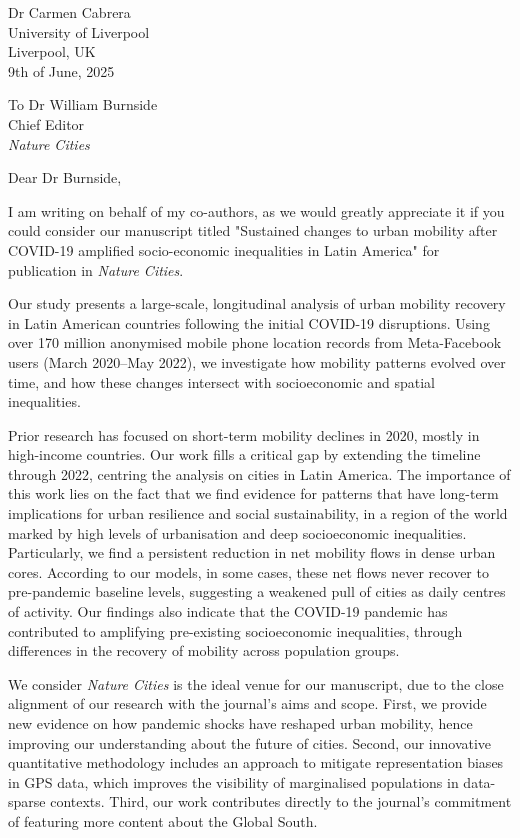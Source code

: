 \documentclass[fleqn,10pt]{letter}
\begin{document}
\begin{flushright}
Dr Carmen Cabrera\\
University of Liverpool\\
Liverpool, UK\\
9th of June, 2025\\
\end{flushright}

\begin{flushleft}
To Dr William Burnside \\
Chief Editor \\
\textit{Nature Cities} \\
\end{flushleft} 

Dear Dr Burnside,

I am writing on behalf of my co-authors, as we would greatly appreciate it if you could consider our manuscript titled "Sustained changes to urban mobility after COVID-19 amplified socio-economic inequalities in Latin America" for publication in \textit{Nature Cities}.

Our study presents a large-scale, longitudinal analysis of urban mobility recovery in Latin American countries following the initial COVID-19 disruptions. Using over 170 million anonymised mobile phone location records from Meta-Facebook users (March 2020–May 2022), we investigate how mobility patterns evolved over time, and how these changes intersect with socioeconomic and spatial inequalities.

Prior research has focused on short-term mobility declines in 2020, mostly in high-income countries. Our work fills a critical gap by extending the timeline through 2022, centring the analysis on cities in Latin America. The importance of this work lies on the fact that we find evidence for patterns that have long-term implications for urban resilience and social sustainability, in a region of the world marked by high levels of urbanisation and deep socioeconomic inequalities. Particularly, we find a persistent reduction in net mobility flows in dense urban cores. According to our models, in some cases, these net flows never recover to pre-pandemic baseline levels, suggesting a weakened pull of cities as daily centres of activity. Our findings also indicate that the COVID-19 pandemic has contributed to amplifying pre-existing socioeconomic inequalities, through differences in the recovery of mobility across population groups. 

We consider \textit{Nature Cities} is the ideal venue for our manuscript, due to the close alignment of our research with the journal’s aims and scope. First, we provide new evidence on how pandemic shocks have reshaped urban mobility, hence improving our understanding about the future of cities. Second, our innovative quantitative methodology includes an approach to mitigate representation biases in GPS data, which improves the visibility of marginalised populations in data-sparse contexts. Third, our work contributes directly to the journal’s commitment of featuring more content about the Global South.
\end{document}
